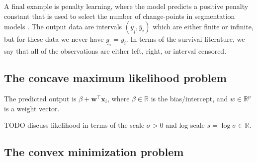 \documentclass[article]{jss}
\newcommand{\RR}{\mathbb R}
\begin{document}
A final example is penalty learning, where the model predicts a
positive penalty constant that is used to select the number of
change-points in segmentation models \citep{HOCKING-penalties}. The
output data are intervals $(\underline y_i, \overline y_i)$ which are
either finite or infinite, but for these data we never have
$\underline y_i = \overline y_i$. In terms of the survival literature,
we say that all of the observations are either left, right, or
interval censored.

\subsection{The concave maximum likelihood problem}

The predicted output is $\beta + \mathbf w^\intercal \mathbf x_i$,
where $\beta\in\RR$ is the bias/intercept, and $w\in\RR^p$ is a weight
vector.

TODO discuss likelihood in terms of the scale $\sigma>0$ and log-scale
$s=\log \sigma\in\RR$.

\subsection{The convex minimization problem}
\end{document}

